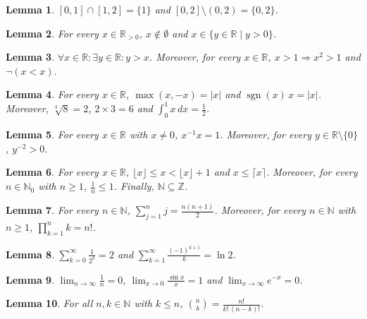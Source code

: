 \documentclass{article}
\newtheorem{lemma}{Lemma}
\begin{document}
\begin{lemma}\label{lem:setops}
$[0,1]\cap[1,2]=\{1\}$ and $[0,2]\setminus(0,2)=\{0,2\}$.
\end{lemma}

\begin{lemma}\label{lem:empty}
For every $x\in\mathbb{R}_{>0}$, $x\notin\emptyset$ and $x\in\{y\in\mathbb{R}\mid y>0\}$.
\end{lemma}

\begin{lemma}\label{lem:logic}
$\forall x\in\mathbb{R}: \exists y\in\mathbb{R}: y>x$.
Moreover, for every $x\in\mathbb{R}$, $x>1\Rightarrow x^2>1$ and $\neg(x<x)$.
\end{lemma}

\begin{lemma}\label{lem:misc}
For every $x\in\mathbb{R}$, $\max(x,-x)=|x|$ and $\operatorname{sgn}(x)\,x=|x|$. Moreover, $\sqrt[3]{8}=2$, $2\times3=6$ and $\int_0^1 x\,dx=\frac12$.
\end{lemma}

\begin{lemma}\label{lem:conditions}
For every $x\in\mathbb{R}$ with $x\neq0$, $x^{-1}x=1$.
Moreover, for every $y\in\mathbb{R}\setminus\{0\}$, $y^{-2}>0$.
\end{lemma}

\begin{lemma}\label{lem:integers}
For every $x\in\mathbb{R}$, $\lfloor x\rfloor\le x<\lfloor x\rfloor+1$ and $x\le\lceil x\rceil$.
Moreover, for every $n\in\mathbb{N}_0$ with $n\ge1$, $\frac1n\le1$.
Finally, $\mathbb{N}\subseteq\mathbb{Z}$.
\end{lemma}

\begin{lemma}\label{lem:finite-sums}
For every $n\in\mathbb{N}$, $\sum_{j=1}^{n} j=\frac{n(n+1)}{2}$.
Moreover, for every $n\in\mathbb{N}$ with $n\ge1$, $\prod_{k=1}^{n} k=n!$.
\end{lemma}

\begin{lemma}\label{lem:series}
$\sum_{k=0}^{\infty}\frac{1}{2^k}=2$ and $\sum_{k=1}^{\infty}\frac{(-1)^{k+1}}{k}=\ln 2$.
\end{lemma}

\begin{lemma}\label{lem:limits}
$\lim_{n\to\infty}\frac1n=0$, $\lim_{x\to0}\frac{\sin x}{x}=1$ and $\lim_{x\to\infty} e^{-x}=0$.
\end{lemma}

\begin{lemma}\label{lem:binomial}
For all $n,k\in\mathbb{N}$ with $k\le n$, $\binom{n}{k}=\frac{n!}{k!\,(n-k)!}$.
\end{lemma}
\end{document}
